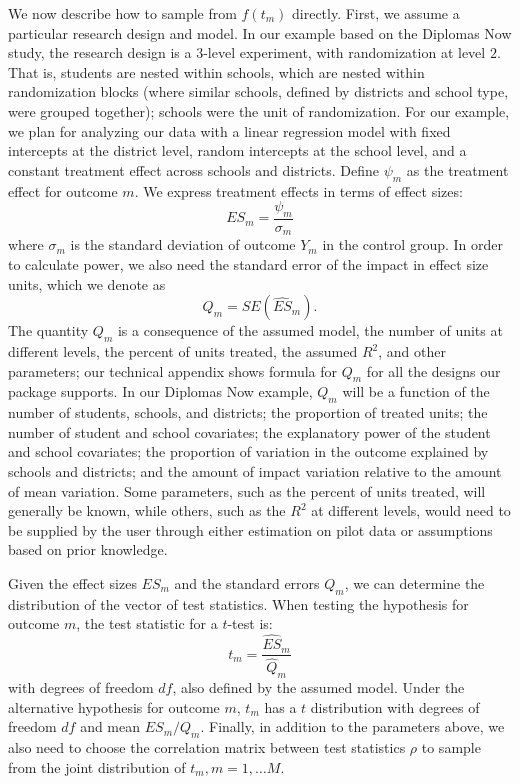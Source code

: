 \documentclass[
]{article}
\begin{document}
We now describe how to sample from \(f(t_m)\) directly. First, we assume
a particular research design and model. In our example based on the
Diplomas Now study, the research design is a \(3\)-level experiment,
with randomization at level \(2\). That is, students are nested within
schools, which are nested within randomization blocks (where similar
schools, defined by districts and school type, were grouped together);
schools were the unit of randomization. For our example, we plan for
analyzing our data with a linear regression model with fixed intercepts
at the district level, random intercepts at the school level, and a
constant treatment effect across schools and districts. Define
\(\psi_m\) as the treatment effect for outcome \(m\). We express
treatment effects in terms of effect sizes:
\[ES_m = \frac{\psi_m}{\sigma_{m}}\] where \(\sigma_{m}\) is the
standard deviation of outcome \(Y_m\) in the control group. In order to
calculate power, we also need the standard error of the impact in effect
size units, which we denote as \[Q_m = SE(\hat{ES}_m).\] The quantity
\(Q_m\) is a consequence of the assumed model, the number of units at
different levels, the percent of units treated, the assumed \(R^2\), and
other parameters; our technical appendix shows formula for \(Q_m\) for
all the designs our package supports. In our Diplomas Now example,
\(Q_m\) will be a function of the number of students, schools, and
districts; the proportion of treated units; the number of student and
school covariates; the explanatory power of the student and school
covariates; the proportion of variation in the outcome explained by
schools and districts; and the amount of impact variation relative to
the amount of mean variation. Some parameters, such as the percent of
units treated, will generally be known, while others, such as the
\(R^2\) at different levels, would need to be supplied by the user
through either estimation on pilot data or assumptions based on prior
knowledge.

Given the effect sizes \(ES_m\) and the standard errors \(Q_m\), we can
determine the distribution of the vector of test statistics. When
testing the hypothesis for outcome \(m\), the test statistic for a
\(t\)-test is: \[t_m = \frac{\hat{ES}_m}{\hat{Q}_m}\] with degrees of
freedom \(df\), also defined by the assumed model. Under the alternative
hypothesis for outcome \(m\), \(t_m\) has a \(t\) distribution with
degrees of freedom \(df\) and mean \(ES_m/Q_m\). Finally, in addition to
the parameters above, we also need to choose the correlation matrix
between test statistics \(\rho\) to sample from the joint distribution
of \(t_m, m = 1, \dots M\).
\end{document}
